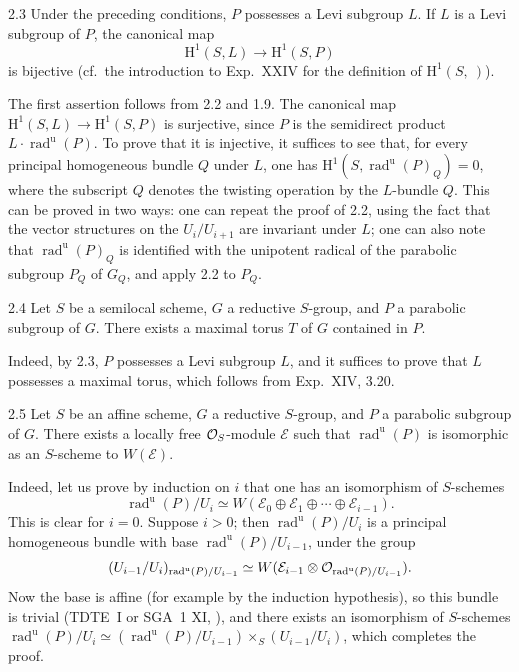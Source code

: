 \begin{corollary}{2.3}\label{XXVI.2.3}
Under the preceding conditions, $P$ possesses a Levi subgroup $L$. If $L$ is a Levi subgroup of $P$, the canonical map
\[
\mathrm H^1(S,L)\to\mathrm H^1(S,P)
\]
is bijective (cf.~the introduction to Exp.~XXIV for the definition of $\mathrm H^1(S,\ )$).
\end{corollary}
The first assertion follows from 2.2 and 1.9. The canonical map $\mathrm H^1(S,L)\to\mathrm H^1(S,P)$ is surjective, since $P$ is the semidirect product $L\cdot\operatorname{rad}^{\mathrm u}(P)$. To prove that it is injective, it suffices to see that, for every principal homogeneous bundle $Q$ under $L$, one has $\mathrm H^1(S,\operatorname{rad}^{\mathrm u}(P)_Q)=0$, where the subscript $Q$ denotes the twisting operation by the $L$-bundle $Q$. This can be proved in two ways: one can repeat the proof of 2.2, using the fact that the vector structures on the $U_i/U_{i+1}$ are invariant under $L$; one can also note that $\operatorname{rad}^{\mathrm u}(P)_Q$ is identified with the unipotent radical of the parabolic subgroup $P_Q$ of $G_Q$, and apply 2.2 to $P_Q$.

\begin{corollary}{2.4}\label{XXVI.2.4}
Let $S$ be a semilocal scheme, $G$ a reductive $S$-group, and $P$ a parabolic subgroup of $G$. There exists a maximal torus $T$ of $G$ contained in $P$.
\end{corollary}
Indeed, by 2.3, $P$ possesses a Levi subgroup $L$, and it suffices to prove that $L$ possesses a maximal torus, which follows from Exp.~XIV, 3.20.

\begin{corollary}{2.5}\label{XXVI.2.5}
Let $S$ be an affine scheme, $G$ a reductive $S$-group, and $P$ a parabolic subgroup of $G$. There exists a locally free $\mathcal{O}_S$-module $\mathcal E$ such that $\operatorname{rad}^{\mathrm u}(P)$ is isomorphic as an $S$-scheme to $W(\mathcal E)$.
\end{corollary}
Indeed, let us prove by induction on $i$ that one has an isomorphism of $S$-schemes
\[
\operatorname{rad}^{\mathrm u}(P)/U_i\simeq W(\mathcal E_0\oplus\mathcal E_1\oplus\cdots\oplus\mathcal E_{i-1}).
\]
This is clear for $i=0$. Suppose $i>0$; then $\operatorname{rad}^{\mathrm u}(P)/U_i$ is a principal homogeneous bundle with base $\operatorname{rad}^{\mathrm u}(P)/U_{i-1}$, under the group
\[
(U_{i-1}/U_i)_{\operatorname{rad}^{\mathrm u}(P)/U_{i-1}}
\simeq W(\mathcal E_{i-1}\otimes\mathcal{O}_{\operatorname{rad}^{\mathrm u}(P)/U_{i-1}}).
\]
Now the base is affine (for example by the induction hypothesis), so this bundle is trivial (TDTE~I or SGA~1 XI, \loccit), and there exists an isomorphism of $S$-schemes $\operatorname{rad}^{\mathrm u}(P)/U_i\simeq(\operatorname{rad}^{\mathrm u}(P)/U_{i-1})\times_S(U_{i-1}/U_i)$, which completes the proof.

